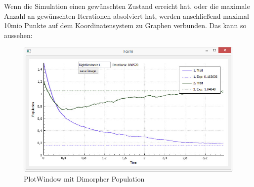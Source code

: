 \documentclass{article}
\begin{document}
		Wenn die Simulation  einen gewünschten Zustand erreicht hat, oder die maximale Anzahl an gewünschten Iterationen absolviert hat, werden anschließend maximal 10mio Punkte auf dem Koordinatensystem zu Graphen verbunden. Das kann so aussehen:
		\begin{figure}[H]
			\centering
			\includegraphics[width=0.7\linewidth]{./PlotWindow_smallBPDL}
			\caption[PlotWindow]{PlotWindow mit Dimorpher Population}
			\label{PlotWindow}
		\end{figure}
		
		
\end{document}

